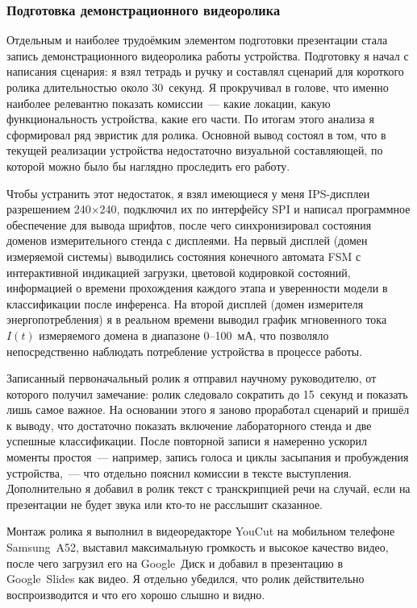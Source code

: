 \subsubsection{Подготовка демонстрационного видеоролика}

Отдельным и наиболее трудоёмким элементом подготовки презентации стала
запись демонстрационного видеоролика работы устройства. Подготовку я
начал с написания сценария: я взял тетрадь и ручку и составлял сценарий
для короткого ролика длительностью около 30~секунд. Я прокручивал в
голове, что именно наиболее релевантно показать комиссии~--- какие
локации, какую функциональность устройства, какие его части. По итогам
этого анализа я сформировал ряд эвристик для ролика. Основной вывод
состоял в том, что в текущей реализации устройства недостаточно
визуальной составляющей, по которой можно было бы наглядно проследить
его работу.

Чтобы устранить этот недостаток, я взял имеющиеся у меня IPS-дисплеи
разрешением 240$\times$240, подключил их по интерфейсу SPI и написал
программное обеспечение для вывода шрифтов, после чего синхронизировал
состояния доменов измерительного стенда с дисплеями. На первый дисплей
(домен измеряемой системы) выводились состояния конечного автомата FSM с
интерактивной индикацией загрузки, цветовой кодировкой состояний,
информацией о времени прохождения каждого этапа и уверенности модели в
классификации после инференса. На второй дисплей (домен измерителя
энергопотребления) я в реальном времени выводил график мгновенного тока
$I(t)$ измеряемого домена в диапазоне 0--100~мА, что позволяло
непосредственно наблюдать потребление устройства в процессе работы.

Записанный первоначальный ролик я отправил научному руководителю, от
которого получил замечание: ролик следовало сократить до 15~секунд и
показать лишь самое важное. На основании этого я заново проработал
сценарий и пришёл к выводу, что достаточно показать включение
лабораторного стенда и две успешные классификации. После повторной
записи я намеренно ускорил моменты простоя~--- например, запись голоса и
циклы засыпания и пробуждения устройства,~--- что отдельно пояснил
комиссии в тексте выступления. Дополнительно я добавил в ролик текст с
транскрипцией речи на случай, если на презентации не будет звука или
кто-то не расслышит сказанное.

Монтаж ролика я выполнил в видеоредакторе YouCut на мобильном телефоне
Samsung~A52, выставил максимальную громкость и высокое качество видео,
после чего загрузил его на Google~Диск и добавил в презентацию в
Google~Slides как видео. Я отдельно убедился, что ролик действительно
воспроизводится и что его хорошо слышно и видно.

